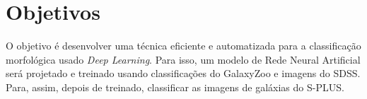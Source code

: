 \section{Objetivos}

O objetivo é desenvolver uma técnica eficiente e automatizada para a  classificação morfológica usado \emph{Deep Learning}. Para isso, um modelo de Rede Neural Artificial será projetado e treinado usando classificações do GalaxyZoo e imagens do SDSS. Para, assim, depois de treinado, classificar as imagens de galáxias do S-PLUS.